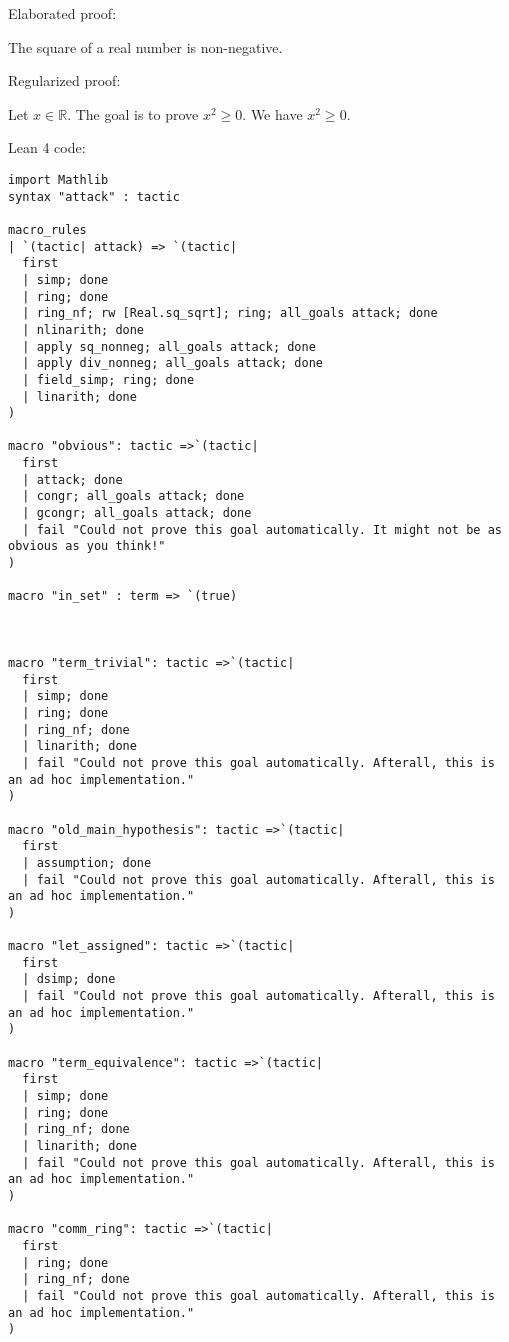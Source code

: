 \documentclass{article}
\begin{document}
Elaborated proof:
\begin{tcolorbox}[colback=green!10, width=\linewidth]
The square of a real number is non-negative.
\end{tcolorbox}

Regularized proof:
\begin{tcolorbox}[colback=red!10, width=\linewidth]
Let $x\in\mathbb{R}$.
The goal is to prove ${{x}}^2 \ge 0$.
We have ${{x}}^2 \ge 0$.
\end{tcolorbox}

Lean 4 code:
\begin{tcolorbox}[colback=white!10, width=\linewidth]
\begin{lstlisting}[language=Lean4]
import Mathlib
syntax "attack" : tactic

macro_rules
| `(tactic| attack) => `(tactic|
  first
  | simp; done
  | ring; done
  | ring_nf; rw [Real.sq_sqrt]; ring; all_goals attack; done
  | nlinarith; done
  | apply sq_nonneg; all_goals attack; done
  | apply div_nonneg; all_goals attack; done
  | field_simp; ring; done
  | linarith; done
)

macro "obvious": tactic =>`(tactic|
  first
  | attack; done
  | congr; all_goals attack; done
  | gcongr; all_goals attack; done
  | fail "Could not prove this goal automatically. It might not be as obvious as you think!"
)

macro "in_set" : term => `(true)



macro "term_trivial": tactic =>`(tactic|
  first
  | simp; done
  | ring; done
  | ring_nf; done
  | linarith; done
  | fail "Could not prove this goal automatically. Afterall, this is an ad hoc implementation."
)

macro "old_main_hypothesis": tactic =>`(tactic|
  first
  | assumption; done
  | fail "Could not prove this goal automatically. Afterall, this is an ad hoc implementation."
)

macro "let_assigned": tactic =>`(tactic|
  first
  | dsimp; done
  | fail "Could not prove this goal automatically. Afterall, this is an ad hoc implementation."
)

macro "term_equivalence": tactic =>`(tactic|
  first
  | simp; done
  | ring; done
  | ring_nf; done
  | linarith; done
  | fail "Could not prove this goal automatically. Afterall, this is an ad hoc implementation."
)

macro "comm_ring": tactic =>`(tactic|
  first
  | ring; done
  | ring_nf; done
  | fail "Could not prove this goal automatically. Afterall, this is an ad hoc implementation."
)


\end{lstlisting}
\end{tcolorbox}
\end{document}
